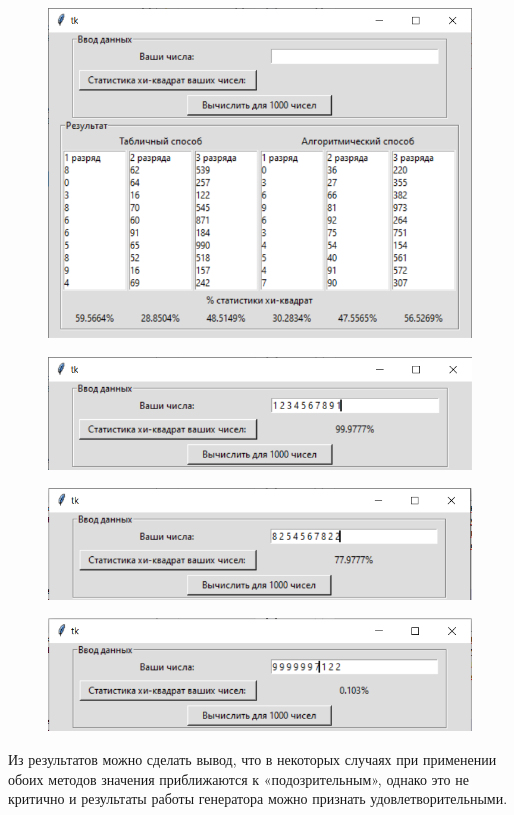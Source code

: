 \documentclass[12pt,a4paper,oneside]{report}
\begin{document}
\begin{figure}[H]
	\centering
	\includegraphics[scale=0.8]{3v.png}
	\label{fig:screenshot003}
\end{figure}

\begin{figure}[H]
	\centering
	\includegraphics[scale=0.8]{4v.png}
	\label{fig:screenshot004}
\end{figure}

\begin{figure}[H]
	\centering
	\includegraphics[scale=0.8]{5v.png}
	\label{fig:screenshot005}
\end{figure}

\begin{figure}[H]
	\centering
	\includegraphics[scale=0.8]{6v.png}
	\label{fig:screenshot006}
\end{figure}


\quad Из результатов можно сделать вывод, что в некоторых случаях при применении обоих методов значения приближаются к «подозрительным», однако это не критично и результаты работы генератора можно признать удовлетворительными.

\clearpage
\end{document}
